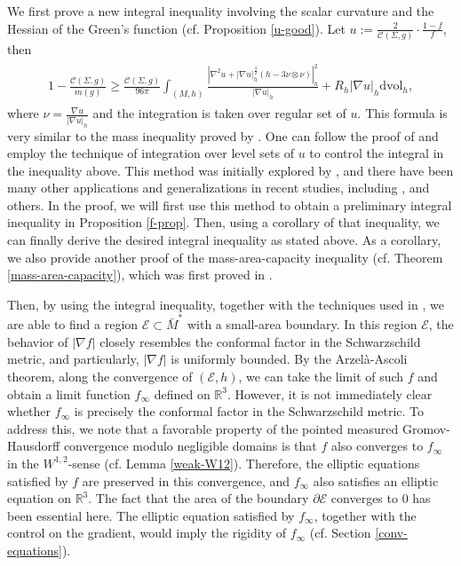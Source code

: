 \documentclass[letter]{amsart}
\theoremstyle{definition}
\theoremstyle{remark}
\begin{document}
We first prove a new integral inequality involving the scalar curvature and the Hessian of the Green's function (cf. Proposition \ref{u-good}). Let $u:= \frac{2}{\mathcal{C}(\Sigma ,g)}\cdot \frac{1-f}{f}$, then
\begin{align*}
	\begin{split}
		1 - \frac{\mathcal{C}(\Sigma ,g)}{m(g)}
		\geq
		       \frac{\mathcal{C}(\Sigma ,g)}{96 \pi }\int_{(M, h)} \frac{\left|\nabla ^2 u + |\nabla u|_h^{\frac{3}{2}} ( h - 3 \nu \otimes \nu )\right|_h^2}{|\nabla u|_h } + R_h |\nabla u|_h  \mathrm{dvol}_h,
	\end{split}
\end{align*}
where $\nu = \frac{\nabla u}{|\nabla u|_h}$ and the integration is taken over regular set of $u$. 
This formula is very similar to the mass inequality proved by \cite[Theorem 1.2]{BKKS'22}.
One can follow the proof of \cite[Theorem 1.2]{BKKS'22} and employ the technique of 
integration over level sets of $u$ to control the integral in the inequality above. 
This method was initially explored by \cite{Stern'22}, 
and there have been many other applications and generalizations in recent studies, including \cite{BHKKZ23, AMO21, AMMO22}, and others. 
In the proof, we will first use this method to obtain a preliminary integral inequality in Proposition \ref{f-prop}. Then, using a corollary of that inequality, we can finally derive the desired integral inequality as stated above. As a corollary, we also provide another proof of the mass-area-capacity inequality (cf. Theorem \ref{mass-area-capacity}), which was first proved in \cite{BM08}.

Then, by using the integral inequality, together with the techniques used in \cite{DS'23}, we are able to find a region $\mathcal{E} \subset \bar{M}^*$ with a small-area boundary. In this region $\mathcal{E}$, the behavior of $|\nabla f|$ closely resembles the conformal factor in the Schwarzschild metric, and particularly, $|\nabla f|$ is uniformly bounded. By the Arzel\`{a}-Ascoli theorem, along the convergence of $(\mathcal{E}, h)$, we can take the limit of such $f$ and obtain a limit function $f_\infty$ defined on $\mathbb{R}^3$. However, it is not immediately clear whether $f_\infty$ is precisely the conformal factor in the Schwarzschild metric. 
To address this, we note that a favorable property of the pointed measured Gromov-Hausdorff convergence modulo negligible domains is that $f$ also converges to $f_\infty$ in the $W^{1,2}$-sense (cf. Lemma \ref{weak-W12}). Therefore, the elliptic equations satisfied by $f$ are preserved in this convergence, and $f_\infty$ also satisfies an elliptic equation on $\mathbb{R}^3$. The fact that the area of the boundary $\partial \mathcal{E}$ converges to $0$ has been essential here. The elliptic equation satisfied by $f_\infty$, together with the control on the gradient, would imply the rigidity of $f_\infty$ (cf. Section \ref{conv-equations}). 
\end{document}

